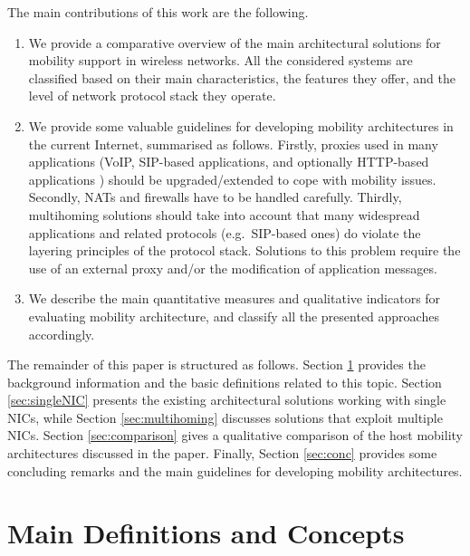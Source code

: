 \documentclass[preprint,12pt]{elsarticle}
\begin{document}
The main contributions of this work are the following.
\begin{enumerate}
  \item We provide a comparative overview of the main architectural solutions 
for mobility support in wireless networks.  
  All the considered systems are classified based on their main 
characteristics, the features they offer, and the level of network protocol stack they operate.
  \item We provide some valuable guidelines for developing mobility 
architectures in the current Internet, summarised as follows. Firstly, proxies used in many applications 
(VoIP, \ac{SIP}-based applications, and optionally HTTP-based applications 
\cite{FerrettiG09}) should be upgraded/extended to cope with mobility issues. 
Secondly, NATs and firewalls have to be handled carefully. Thirdly, 
multihoming solutions should take into account that many widespread 
applications and related protocols (e.g.~\ac{SIP}-based ones) do violate the layering principles of the protocol stack. Solutions to this problem require the use of an 
external proxy and/or the modification of application messages.
\item We describe the main quantitative measures and qualitative indicators for evaluating mobility 
architecture, and classify all the presented approaches accordingly.
\end{enumerate}
The remainder of this paper is structured as follows.
Section \ref{sec:background} provides the background information and the basic 
definitions related to this topic.
Section \ref{sec:singleNIC} presents the existing architectural solutions 
working with single \acp{NIC}, while Section \ref{sec:multihoming} discusses 
solutions that exploit multiple \acp{NIC}. 
Section \ref{sec:comparison} gives a qualitative comparison of the host 
mobility architectures discussed in the paper. 
Finally, Section \ref{sec:conc} provides some concluding remarks and the main guidelines 
for developing mobility architectures.

\section{Main Definitions and Concepts}
\label{sec:background}
\end{document}
